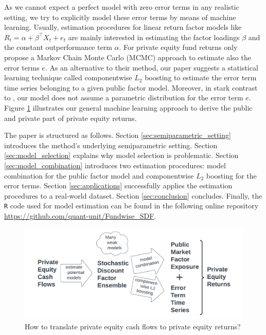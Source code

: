 \documentclass[12pt]{article}
\begin{document}
As we cannot expect a perfect model with zero error terms in any realistic setting, we try to explicitly model these error terms by means of machine learning.
Usually, estimation procedures for linear return factor models like $R_t= \alpha + \beta^{\top} X_t + e_t$ are mainly interested in estimating the factor loadings $\beta$ and the constant outperformance term $\alpha$.
For private equity fund returns only \cite{ACGP18} propose a Markov Chain Monte Carlo (MCMC) approach to estimate also the error terms $e$.
As an alternative to their method, our paper suggests a statistical learning technique called componentwise $L_2$ boosting to estimate the error term time series belonging to a given public factor model.
Moreover, in stark contrast to \cite{ACGP18}, our model does not assume a parametric distribution for the error term $e$.
Figure \ref{fig:how} illustrates our general machine learning approach to derive the public and private part of private equity returns.

The paper is structured as follows.
Section \ref{sec:semiparametric_setting} introduces the method's underlying semiparametric setting.
Section \ref{sec:model_selection} explains why model selection is problematic.
Section \ref{sec:model_combination} introduces two estimation procedures: model combination for the public factor model and componentwise $L_2$ boosting for the error terms.
Section \ref{sec:applications} successfully applies the estimation procedures to a real-world dataset.
Section \ref{sec:conclusion} concludes.
Finally, the \texttt{R} code used for model estimation can be found in the following online repository \url{https://github.com/quant-unit/Fundwise_SDF}.

\begin{figure}[ht]
	\centering
	\includegraphics[width=14cm]{FlowChart/MLPER}
	\caption{How to translate private equity cash flows to private equity returns?}
	\label{fig:how}
\end{figure}
\end{document}
